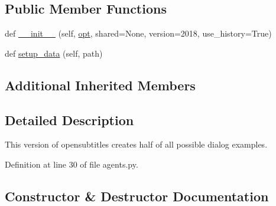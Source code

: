 \subsection*{Public Member Functions}
\begin{DoxyCompactItemize}
\item 
def \hyperlink{classparlai_1_1tasks_1_1opensubtitles_1_1agents_1_1HalfTeacher_aea4e464ad2d0ac4af96d426b171324bc}{\+\_\+\+\_\+init\+\_\+\+\_\+} (self, \hyperlink{classparlai_1_1core_1_1teachers_1_1FbDialogTeacher_af7a9ec497b9cd0292d7b8fa220da7c28}{opt}, shared=None, version=\textquotesingle{}2018\textquotesingle{}, use\+\_\+history=True)
\item 
def \hyperlink{classparlai_1_1tasks_1_1opensubtitles_1_1agents_1_1HalfTeacher_a36081b74536cdad3bc3673b324da1f02}{setup\+\_\+data} (self, path)
\end{DoxyCompactItemize}
\subsection*{Additional Inherited Members}


\subsection{Detailed Description}
\begin{DoxyVerb}This version of opensubtitles creates half of all possible dialog examples.
\end{DoxyVerb}
 

Definition at line 30 of file agents.\+py.



\subsection{Constructor \& Destructor Documentation}
\mbox{\label{classparlai_1_1tasks_1_1opensubtitles_1_1agents_1_1HalfTeacher_aea4e464ad2d0ac4af96d426b171324bc}} 
